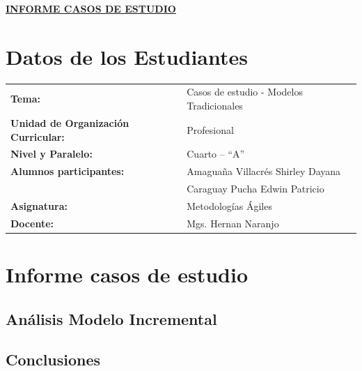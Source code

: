 \documentclass[12pt,a4paper]{article}
\begin{document}
	
	\thispagestyle{fancy}
	
	\begin{center}
		\vspace*{0.1cm}
		{\large\bfseries\underline{INFORME CASOS DE ESTUDIO}}
	\end{center}
	
	\vspace{0.3cm}
	
	\section{Datos de los Estudiantes}
	
	\begin{tabular}{@{}p{6.0cm} >{\raggedright\arraybackslash}p{9.0cm}@{}}
		\textbf{Tema:}                              & Casos de estudio - Modelos Tradicionales \\[6pt]
		\textbf{Unidad de Organización Curricular:} & Profesional\\[6pt]
		\textbf{Nivel y Paralelo:}                  & Cuarto -- ``A'' \\[6pt]
		\textbf{Alumnos participantes:}             & Amaguaña Villacrés Shirley Dayana \\[6pt]
		\textbf  									& Caraguay Pucha Edwin Patricio\\[6pt]
		\textbf{Asignatura:}                        & Metodologías Ágiles \\[6pt]
		\textbf{Docente:}                           & Mgs. Hernan Naranjo \\
	\end{tabular}
	
	\vspace{0.4cm}
	
	\section{Informe casos de estudio}
	\subsection{Análisis Modelo Incremental}
	
	
	
	
	\vspace{0.5cm}
	
	\subsection{Conclusiones}
	
\end{document}
